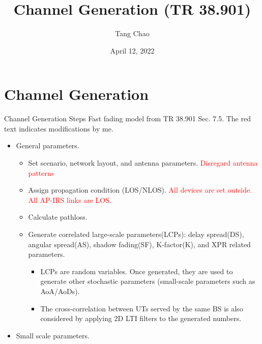 \documentclass{beamer}
\title[NYCU]{Channel Generation (TR 38.901)}   %
\author{Tang Chao} %
\institute[] %
{
\textit{sisy710.ee04@g2.nctu.edu.tw} %
\\
\medskip
National Yang Ming Chiao Tung University\\ %
}
\date{April 12, 2022 } %
\begin{document}
\begin{frame}
\titlepage %
\end{frame}
\logo{}

\section{Channel Generation}
\begin{frame}[allowframebreaks]{Channel Generation Steps}
Fast fading model from TR 38.901 Sec. 7.5. The red text indicates modifications by me. 
\begin{itemize}
\item General parameters.
\begin{itemize}

    \item Set scenario, network layout, and antenna parameters. \textcolor{red}{Disregard antenna patterns}
    \item Assign propagation condition (LOS/NLOS). \textcolor{red}{All devices are set outside. All AP-IRS links are LOS.}
    \item Calculate pathloss.
    \item Generate correlated large-scale parameters(LCPs): delay spread(DS), angular spread(AS), shadow fading(SF), K-factor(K), and XPR related parameters.
    \begin{itemize}
        \item LCPs are random variables. Once generated, they are used to generate other stochastic parameters (small-scale parameters such as AoA/AoDs).
        \item The cross-correlation between UTs served by the same BS is also considered by applying 2D LTI filters to the generated numbers.
    \end{itemize}
\end{itemize}
\framebreak
\item Small scale parameters.
\begin{itemize}


\end{itemize}
\end{itemize}
\end{frame}
\end{document}
